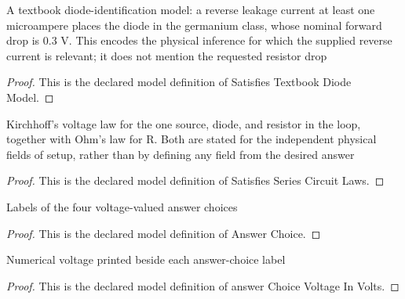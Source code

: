 \begin{definition}
  \label{def:physics:phyx-mini-0572:phyxminiproblems-problemphyxmini0572-satisfiestextbookdiodemodel}
  A textbook diode-identification model: a reverse leakage current at least one microampere places the diode in the germanium class, whose nominal forward drop is 0.3 V. This encodes the physical inference for which the supplied reverse current is relevant; it does not mention the requested resistor drop
\end{definition}
\begin{proof}
  This is the declared model definition of Satisfies Textbook Diode Model.
\end{proof}
\begin{definition}
  \label{def:physics:phyx-mini-0572:phyxminiproblems-problemphyxmini0572-satisfiesseriescircuitlaws}
  Kirchhoff's voltage law for the one source, diode, and resistor in the loop, together with Ohm's law for R. Both are stated for the independent physical fields of setup, rather than by defining any field from the desired answer
\end{definition}
\begin{proof}
  This is the declared model definition of Satisfies Series Circuit Laws.
\end{proof}
\begin{definition}
  \label{def:physics:phyx-mini-0572:phyxminiproblems-problemphyxmini0572-answerchoice}
  Labels of the four voltage-valued answer choices
\end{definition}
\begin{proof}
  This is the declared model definition of Answer Choice.
\end{proof}
\begin{definition}
  \label{def:physics:phyx-mini-0572:phyxminiproblems-problemphyxmini0572-answerchoicevoltageinvolts}
  Numerical voltage printed beside each answer-choice label
\end{definition}
\begin{proof}
  This is the declared model definition of answer Choice Voltage In Volts.
\end{proof}
